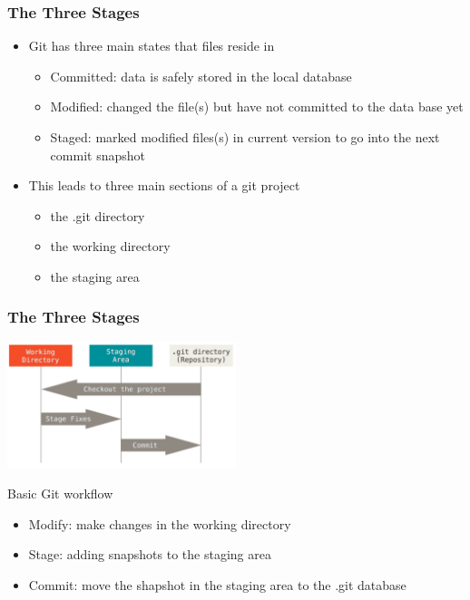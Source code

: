 \begin{frame}
  \frametitle{The Three Stages}
  \begin{itemize}
    \item Git has three main states that files reside in
      \begin{itemize}
        \item Committed: data is safely stored in the local database
        \item Modified: changed the file(s) but have not committed to the
          data base yet
        \item Staged: marked modified files(s) in current version to go into the
          next commit snapshot
      \end{itemize}
    \item This leads to three main sections of a git project
      \begin{itemize}
        \item the .git directory
        \item the working directory
        \item the staging area
      \end{itemize}
  \end{itemize}
\end{frame}

\begin{frame}
  \frametitle{The Three Stages}
  \begin{center}
  \includegraphics[width=0.5\textwidth]{areas}
  \end{center}

  Basic Git workflow
  \begin{itemize}
    \item Modify: make changes in the working directory
    \item Stage: adding snapshots to the staging area
    \item Commit: move the shapshot in the staging area to the .git database
  \end{itemize}
\end{frame}

